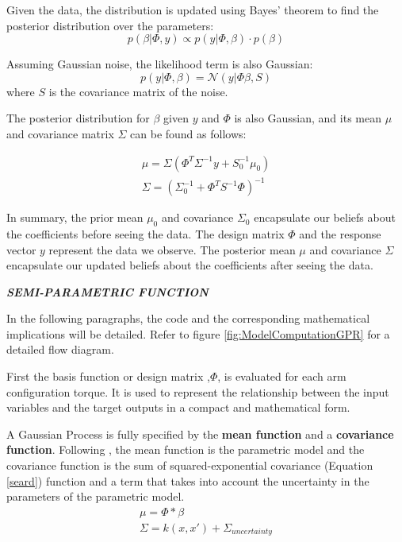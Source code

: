 Given the data, the distribution is updated using Bayes' theorem to find the posterior distribution over the parameters:
\begin{equation}
    p(\beta | \Phi, y) \propto p(y | \Phi, \beta) \cdot p(\beta)
\end{equation}

Assuming Gaussian noise, the likelihood term is also Gaussian:
\begin{equation}
  p(y | \Phi, \beta) = \mathcal{N}(y | \Phi \beta, S)
\end{equation}
where \( S \) is the covariance matrix of the noise.

The posterior distribution for \( \beta \) given \( y \) and \( \Phi \) is also Gaussian, and its mean \( \mu \) and covariance matrix \( \Sigma \) can be found as follows:

\begin{equation}
\begin{aligned}
     \mu = \Sigma (\Phi^T \Sigma^{-1} y + S_0^{-1} \mu_0) \\
    \Sigma = \left( \Sigma_0^{-1} + \Phi^T S^{-1} \Phi \right)^{-1}
\end{aligned}
\end{equation}

In summary, the prior mean \( \mu_0 \) and covariance \( \Sigma_0 \) encapsulate our beliefs about the coefficients before seeing the data. The design matrix \( \Phi \) and the response vector \( y \) represent the data we observe. The posterior mean \( \mu \) and covariance \( \Sigma \) encapsulate our updated beliefs about the coefficients after seeing the data.

\textbf{\textit{SEMI-PARAMETRIC FUNCTION}}

In the following paragraphs, the code and the corresponding mathematical implications will be detailed.  Refer to figure \ref{fig:ModelComputationGPR} for a detailed flow diagram.

First the basis function or design matrix ,$\Phi$, is evaluated for each arm configuration torque. It is used to represent the relationship between the input variables and the target outputs in a compact and mathematical form. 

A Gaussian Process is fully specified by the \textbf{mean function} and a \textbf{covariance function}. Following \cite{SPI}, the mean function is the parametric model and the covariance function is the sum of squared-exponential covariance (Equation \ref{seard})  function and a term that takes into account the uncertainty in the parameters of the parametric model. 
\begin{equation}
\begin{aligned}
    \mu = \Phi*\beta \\
    \Sigma = k(x,x')  + \Sigma_{uncertainty}
\end{aligned}
\end{equation}

